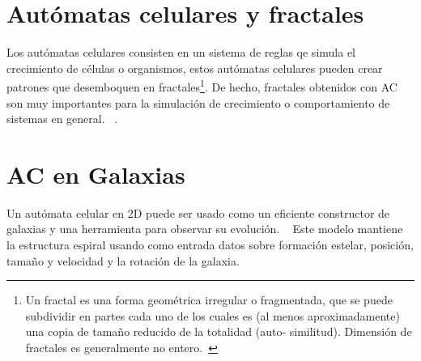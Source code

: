 \documentclass[12tp]{article}
\begin{document}
\begin{center}
\end{center}
\section{Autómatas celulares y fractales}
Los autómatas celulares consisten en un sistema de reglas qe simula el crecimiento de 
células o organismos, estos autómatas celulares pueden crear patrones que desemboquen
en fractales\footnote{Un fractal es una forma geométrica irregular o fragmentada, que se puede subdividir en partes
cada uno de los cuales es (al menos aproximadamente) una copia de tamaño reducido de la totalidad (auto-
similitud). Dimensión de fractales es generalmente no entero.~\cite{claseT}}. De hecho, fractales obtenidos con AC son muy importantes para la simulación
de crecimiento o comportamiento de sistemas en general. ~\cite{othersite}.

\section{AC en Galaxias}
Un autómata celular en 2D puede ser usado como un eficiente constructor de galaxias y una herramienta para observar su evolución. 
~\cite{kent}
Este modelo mantiene la estructura espiral usando como entrada datos sobre formación estelar, posición, tamaño y velocidad y 
la rotación de la galaxia.~\cite{kent}
\end{document}
